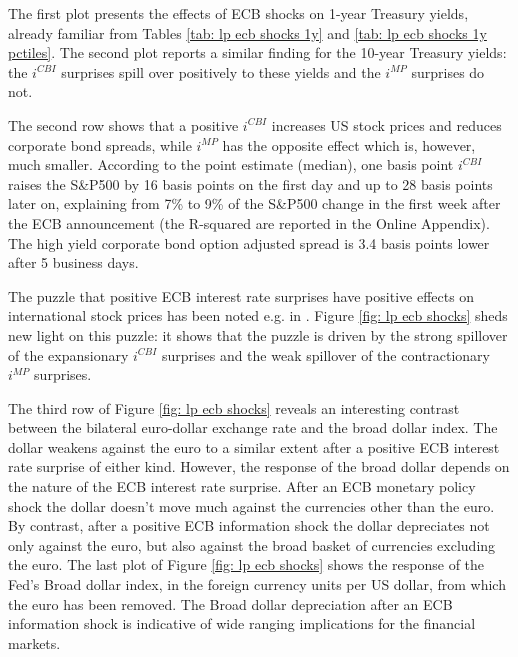 \documentclass[a4paper,12pt]{article}
\begin{document}
The first plot presents the effects of ECB shocks on 1-year Treasury yields,
already familiar from Tables \ref{tab: lp ecb shocks 1y} and \ref{tab: lp ecb shocks 1y pctiles}.
The second plot reports a similar finding for the 10-year Treasury yields: the $i^{CBI}$ surprises spill over positively to these yields and the $i^{MP}$ surprises do not.

The second row shows that a positive $i^{CBI}$ increases US stock prices and reduces corporate bond spreads,
while $i^{MP}$ has the opposite effect which is, however, much smaller.
According to the point estimate (median), one basis point $i^{CBI}$ raises the S\&P500 by 16 basis points on the first day and up to 28 basis points later on, explaining from 7\% to 9\% of  the S\&P500 change in the first week after the ECB announcement (the R-squared are reported in the Online Appendix).
The high yield corporate bond option adjusted spread is 3.4 basis points lower after 5 business days.

The puzzle that positive ECB interest rate surprises have positive effects on international stock prices 
has been noted e.g. in \cite{Brusa_etal_2020}. Figure \ref{fig: lp ecb shocks} sheds new light on this puzzle: it shows
that the puzzle is driven by the strong spillover of the expansionary $i^{CBI}$ surprises and the weak spillover of the contractionary $i^{MP}$ surprises.

The third row of Figure \ref{fig: lp ecb shocks} reveals an interesting contrast between
the bilateral euro-dollar exchange rate and the broad dollar index. 
The dollar weakens against the euro to a similar extent after
a positive ECB interest rate surprise of either kind.
However, the response of the broad dollar depends on the nature of the ECB interest rate surprise. After an ECB monetary policy shock the dollar doesn't move much against the currencies other than the euro.
By contrast, after a positive ECB information shock the dollar depreciates not only against
the euro, but also against
the broad basket of currencies excluding the euro.
The last plot of Figure \ref{fig: lp ecb shocks} shows the response of the Fed's Broad dollar index,
in the foreign currency units per US dollar, from which the euro has been removed.
The Broad dollar depreciation after an ECB information shock is indicative of wide ranging implications for the financial markets.
\end{document}
